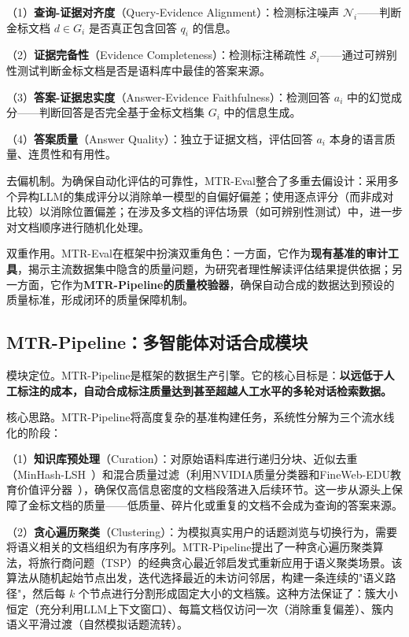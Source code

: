 （1）\textbf{查询-证据对齐度}（Query-Evidence Alignment）：检测标注噪声 $\mathcal{N}_i$——判断金标文档 $d \in G_i$ 是否真正包含回答 $q_i$ 的信息。

（2）\textbf{证据完备性}（Evidence Completeness）：检测标注稀疏性 $\mathcal{S}_i$——通过可辨别性测试判断金标文档是否是语料库中最佳的答案来源。

（3）\textbf{答案-证据忠实度}（Answer-Evidence Faithfulness）：检测回答 $a_i$ 中的幻觉成分——判断回答是否完全基于金标文档集 $G_i$ 中的信息生成。

（4）\textbf{答案质量}（Answer Quality）：独立于证据文档，评估回答 $a_i$ 本身的语言质量、连贯性和有用性。


去偏机制。为确保自动化评估的可靠性，MTR-Eval整合了多重去偏设计：采用多个异构LLM的集成评分以消除单一模型的自偏好偏差；使用逐点评分（而非成对比较）以消除位置偏差；在涉及多文档的评估场景（如可辨别性测试）中，进一步对文档顺序进行随机化处理。

双重作用。MTR-Eval在框架中扮演双重角色：一方面，它作为\textbf{现有基准的审计工具}，揭示主流数据集中隐含的质量问题，为研究者理性解读评估结果提供依据；另一方面，它作为\textbf{MTR-Pipeline的质量校验器}，确保自动合成的数据达到预设的质量标准，形成闭环的质量保障机制。

\subsection{MTR-Pipeline：多智能体对话合成模块}

模块定位。MTR-Pipeline是框架的数据生产引擎。它的核心目标是：\textbf{以远低于人工标注的成本，自动合成标注质量达到甚至超越人工水平的多轮对话检索数据。}

核心思路。MTR-Pipeline将高度复杂的基准构建任务，系统性分解为三个流水线化的阶段：

（1）\textbf{知识库预处理}（Curation）：对原始语料库进行递归分块、近似去重（MinHash-LSH~\citep{broder1997resemblance}）和混合质量过滤（利用NVIDIA质量分类器和FineWeb-EDU教育价值评分器~\citep{penedo2024finewebdatasets}），确保仅高信息密度的文档段落进入后续环节。这一步从源头上保障了金标文档的质量——低质量、碎片化或重复的文档不会成为查询的答案来源。
    
（2）\textbf{贪心遍历聚类}（Clustering）：为模拟真实用户的话题浏览与切换行为，需要将语义相关的文档组织为有序序列。MTR-Pipeline提出了一种贪心遍历聚类算法，将旅行商问题（TSP）的经典贪心最近邻启发式重新应用于语义聚类场景。该算法从随机起始节点出发，迭代选择最近的未访问邻居，构建一条连续的"语义路径"，然后每 $k$ 个节点进行分割形成固定大小的文档簇。这种方法保证了：簇大小恒定（充分利用LLM上下文窗口）、每篇文档仅访问一次（消除重复偏差）、簇内语义平滑过渡（自然模拟话题流转）。
    
